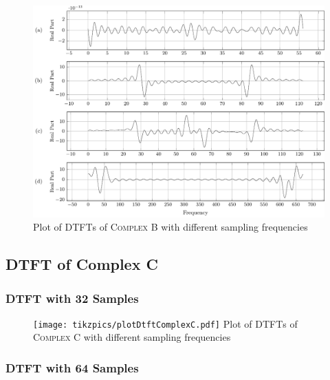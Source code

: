 \documentclass[../../course]{subfiles}
\begin{document}
\begin{figure} [H]
    \centering
     {
        \includegraphics[height = 0.8\textheight] {tikzpics/plotDtftComplexB64.pdf}
    }
     {Plot of \textsc{DTFT}s of \textsc{Complex B} with different sampling frequencies}
    \label{plt:dtftComplexB}
\end{figure}


\subsection{DTFT of Complex C} \label{ssec:dtftCplxC}

\subsubsection{DTFT with 32 Samples}

\begin{figure} [H]
    \centering
     {
        \texttt{[image: tikzpics/plotDtftComplexC.pdf]}
    }
     {Plot of \textsc{DTFT}s of \textsc{Complex C} with different sampling frequencies}
    \label{plt:dtftComplexC}
\end{figure}

\subsubsection{DTFT with 64 Samples}
\end{document}
